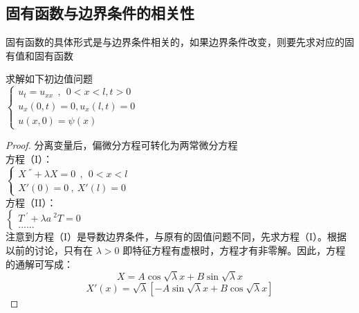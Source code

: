 \subsection{固有函数与边界条件的相关性}
固有函数的具体形式是与边界条件相关的，如果边界条件改变，则要先求对应的固有值和固有函数
\begin{example} %
	求解如下初边值问题\\
	$\displaystyle  \begin{cases}
		u_{t} =u_{xx} ~~,~~ 0<x<l, t>0\\
		u_x (0,t) =0, u_x (l,t)=0 \\
		u(x,0) =\psi(x)
	\end{cases}$ \\	
\begin{proof} 
分离变量后，偏微分方程可转化为两常微分方程 \\
方程（I）：\\
$\displaystyle  \begin{cases}
	X~^{''} +\lambda X=0  ~~,~~ 0<x<l\\
	X'(0)=0 ~,~X' (l)=0
\end{cases}$ \\	
方程（II）：\\
$\displaystyle  \begin{cases}
	T~^{'} +\lambda {a~^2 T}=0 \\
	......
\end{cases}$ \\	
注意到方程（I）是导数边界条件，与原有的固值问题不同，先求方程（I）。根据以前的讨论，只有在
$\lambda >0 $ 即特征方程有虚根时，方程才有非零解。因此，方程的通解可写成：
\begin{equation*}
	X=A\cos \sqrt{\lambda} x + B \sin \sqrt{\lambda} x
\end{equation*}
\begin{equation*}
	X' (x)=\sqrt{\lambda} [-A\sin \sqrt{\lambda} x + B \cos \sqrt{\lambda} x]
\end{equation*}


\end{proof}
\end{example}
